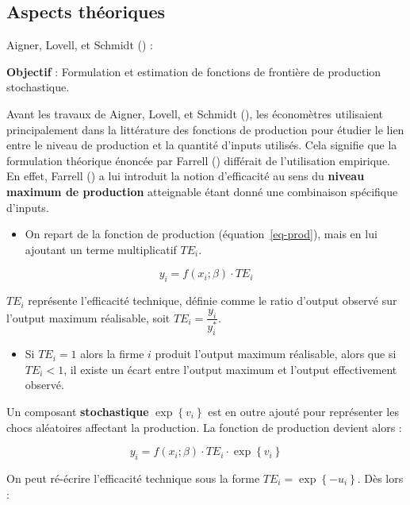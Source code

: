 \documentclass[
  12pt,
]{report}
\providecommand{\tightlist}{%
  \setlength{\itemsep}{0pt}\setlength{\parskip}{0pt}}\usepackage{longtable,booktabs,array}
\begin{document}
\subsection{Aspects théoriques}\label{aspects-thuxe9oriques-1}

Aigner, Lovell, et Schmidt () :

\textbf{Objectif} : Formulation et estimation de fonctions de frontière
de production stochastique.

Avant les travaux de Aigner, Lovell, et Schmidt
(), les économètres utilisaient
principalement dans la littérature des fonctions de production pour
étudier le lien entre le niveau de production et la quantité d'inputs
utilisés. Cela signifie que la formulation théorique énoncée par Farrell
() différait de l'utilisation empirique.
En effet, Farrell () a lui introduit la
notion d'efficacité au sens du \textbf{niveau maximum de production}
atteignable étant donné une combinaison spécifique d'inputs.

\begin{itemize}
\tightlist
\item
  On repart de la fonction de production (équation~\ref{eq-prod}), mais
  en lui ajoutant un terme multiplicatif \(TE_i\).
\end{itemize}

\[{\displaystyle y_{i}=f(x_{i};\beta )\cdot TE_{i}}\]

\(TE_i\) représente l'efficacité technique, définie comme le ratio
d'output observé sur l'output maximum réalisable, soit
\(TE_i = \dfrac{y_i}{y_i^*}\).

\begin{itemize}
\tightlist
\item
  Si \(TE_i = 1\) alors la firme \(i\) produit l'output maximum
  réalisable, alors que si \(TE_i < 1\), il existe un écart entre
  l'output maximum et l'output effectivement observé.
\end{itemize}

Un composant \textbf{stochastique} \({\exp \left\{{v_{i}}\right\}}\) est
en outre ajouté pour représenter les chocs aléatoires affectant la
production. La fonction de production devient alors :

\[{\displaystyle y_{i}=f(x_{i};\beta )\cdot TE_{i}\cdot \exp \left\{{v_{i}}\right\}}\]

On peut ré-écrire l'efficacité technique sous la forme
\({\displaystyle TE_{i}=\exp \left\{{-u_{i}}\right\}}\). Dès lors :
\end{document}
